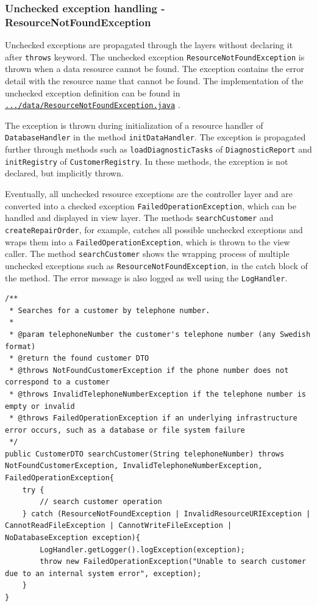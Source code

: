 \documentclass[a4paper]{scrartcl}
\begin{document}
\subsubsection{Unchecked exception handling - ResourceNotFoundException}

Unchecked exceptions are propagated through the layers without declaring it after \texttt{throws} keyword. The unchecked exception \texttt{ResourceNotFoundException} is thrown when a data resource cannot be found. The exception contains the error detail with the resource name that cannot be found. The implementation of the unchecked exception definition can be found in \href{https://github.com/mo-mosverkstad/java-learning/blob/183fd32417c1e32630f41e821e872cda2c43eda9/maven-projects/ElectricBikeRepair/src/main/java/se/ebikerepair/data/ResourceNotFoundException.java}{\nolinkurl{.../data/ResourceNotFoundException.java}} \cite{sourcecode}.

The exception is thrown during initialization of a resource handler of \texttt{DatabaseHandler} in the method \texttt{initDataHandler}. The exception is propagated further through methods such as \texttt{loadDiagnosticTasks} of \texttt{DiagnosticReport} and \texttt{initRegistry} of \texttt{CustomerRegistry}. In these methods, the exception is not declared, but implicitly thrown.

Eventually, all unchecked resource exceptions are the controller layer and are converted into a checked exception \texttt{FailedOperationException}, which can be handled and displayed in view layer. The methods \texttt{searchCustomer} and \texttt{createRepairOrder}, for example, catches all possible unchecked exceptions and wraps them into a \texttt{FailedOperationException}, which is thrown to the view caller. The method \texttt{searchCustomer} shows the wrapping process of multiple unchecked exceptions such as \texttt{ResourceNotFoundException}, in the catch block of the method. The error message is also logged as well using the \texttt{LogHandler}.

\begin{lstlisting}[style=javastyle, caption={ResourceNotFoundException wrapped to FailedOperationException}]
/**
 * Searches for a customer by telephone number.
 *
 * @param telephoneNumber the customer's telephone number (any Swedish format)
 * @return the found customer DTO
 * @throws NotFoundCustomerException if the phone number does not correspond to a customer
 * @throws InvalidTelephoneNumberException if the telephone number is empty or invalid
 * @throws FailedOperationException if an underlying infrastructure error occurs, such as a database or file system failure
 */
public CustomerDTO searchCustomer(String telephoneNumber) throws NotFoundCustomerException, InvalidTelephoneNumberException, FailedOperationException{
    try {
        // search customer operation
    } catch (ResourceNotFoundException | InvalidResourceURIException | CannotReadFileException | CannotWriteFileException | NoDatabaseException exception){
        LogHandler.getLogger().logException(exception);
        throw new FailedOperationException("Unable to search customer due to an internal system error", exception);
    }
}
\end{lstlisting}
\end{document}
